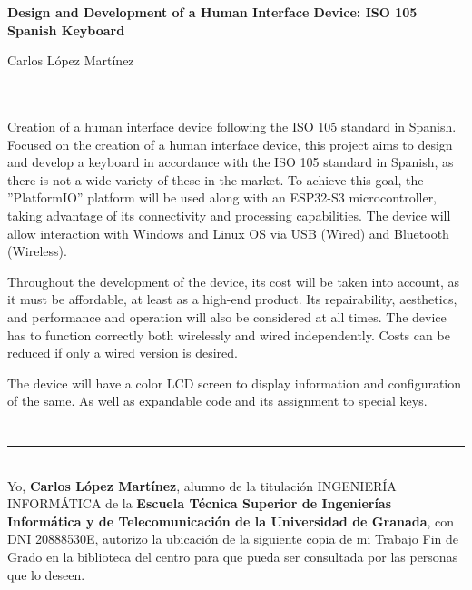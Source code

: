 \thispagestyle{empty}


\begin{center}
{\large\bfseries Design and Development of a Human Interface Device: ISO 105 Spanish Keyboard}\\
\end{center}
\begin{center}
Carlos López Martínez\\
\end{center}

\\

\vspace{0.7cm}
\\

Creation of a human interface device following the ISO 105 standard in Spanish. Focused on the creation of a human interface device, this project aims to design and develop a keyboard in accordance with the ISO 105 standard in Spanish, as there is not a wide variety of these in the market. To achieve this goal, the ''PlatformIO'' platform will be used along with an ESP32-S3 microcontroller, taking advantage of its connectivity and processing capabilities. The device will allow interaction with Windows and Linux OS via USB (Wired) and Bluetooth (Wireless).

Throughout the development of the device, its cost will be taken into account, as it must be affordable, at least as a high-end product. Its repairability, aesthetics, and performance and operation will also be considered at all times. The device has to function correctly both wirelessly and wired independently. Costs can be reduced if only a wired version is desired.

The device will have a color LCD screen to display information and configuration of the same. As well as expandable code and its assignment to special keys.

\chapter*{}
\thispagestyle{empty}

\noindent\rule[-1ex]{\textwidth}{2pt}\\[4.5ex]

Yo, \textbf{Carlos López Martínez}, alumno de la titulación INGENIERÍA INFORMÁTICA de la \textbf{Escuela Técnica Superior
de Ingenierías Informática y de Telecomunicación de la Universidad de Granada}, con DNI 20888530E, autorizo la
ubicación de la siguiente copia de mi Trabajo Fin de Grado en la biblioteca del centro para que pueda ser
consultada por las personas que lo deseen.

